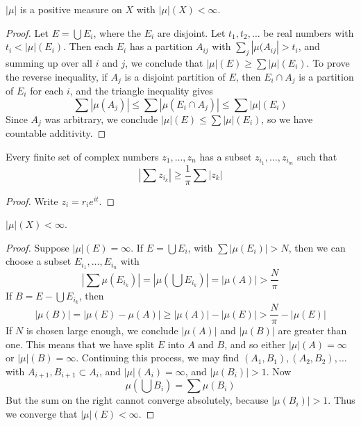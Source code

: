 \begin{theorem}
    $|\mu|$ is a positive measure on $X$ with $|\mu|(X) < \infty$.
\end{theorem}
\begin{proof}
    Let $E = \bigcup E_i$, where the $E_i$ are disjoint. Let $t_1, t_2, \dots$ be real numbers with $t_i < |\mu|(E_i)$. Then each $E_i$ has a partition $A_{ij}$ with $\sum_j |\mu(A_{ij}| > t_i$, and summing up over all $i$ and $j$, we conclude that $|\mu|(E) \geq \sum |\mu|(E_i)$. To prove the reverse inequality, if $A_j$ is a disjoint partition of $E$, then $E_i \cap A_j$ is a partition of $E_i$ for each $i$, and the triangle inequality gives
    \[ \sum |\mu(A_j)| \leq \sum |\mu(E_i \cap A_j)| \leq \sum |\mu|(E_i) \]
    Since $A_j$ was arbitrary, we conclude $|\mu|(E) \leq \sum |\mu|(E_i)$, so we have countable additivity.
\end{proof}

\begin{lemma}
    Every finite set of complex numbers $z_1, \dots, z_n$ has a subset $z_{i_1} ,\dots, z_{i_m}$ such that
    \[ |\sum z_{i_k}| \geq \frac{1}{\pi} \sum |z_k| \]
\end{lemma}
\begin{proof}
    Write $z_i = r_ie^{it}$.
\end{proof}

\begin{theorem}
    $|\mu|(X) < \infty$.
\end{theorem}
\begin{proof}
    Suppose $|\mu|(E) = \infty$. If $E = \bigcup E_i$, with $\sum |\mu(E_i)| > N$, then we can choose a subset $E_{i_1}, \dots, E_{i_n}$ with
    \[ \left| \sum \mu(E_{i_k}) \right| = |\mu(\bigcup E_{i_k})| = |\mu(A)| > \frac{N}{\pi} \]
    If $B = E - \bigcup E_{i_k}$, then
    \[ |\mu(B)| = |\mu(E) - \mu(A)| \geq |\mu(A)| - |\mu(E)| > \frac{N}{\pi} - |\mu(E)| \]
    If $N$ is chosen large enough, we conclude $|\mu(A)|$ and $|\mu(B)|$ are greater than one. This means that we have split $E$ into $A$ and $B$, and so either $|\mu|(A) = \infty$ or $|\mu|(B) = \infty$. Continuing this process, we may find $(A_1, B_1),(A_2,B_2), \dots$ with $A_{i+1}, B_{i+1} \subset A_i$, and $|\mu|(A_i) = \infty$, and $|\mu(B_i)| > 1$. Now
    \[ \mu \left( \bigcup B_i \right) = \sum \mu(B_i) \]
    But the sum on the right cannot converge absolutely, because $|\mu(B_i)| > 1$. Thus we converge that $|\mu|(E) < \infty$.
\end{proof}


